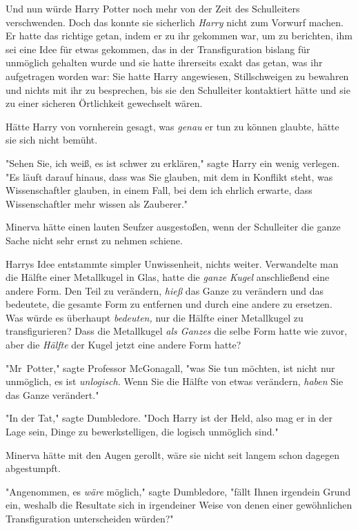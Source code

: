 {Und nun würde Harry Potter noch mehr von der Zeit des Schulleiters verschwenden. Doch das konnte sie sicherlich \emph{Harry} nicht zum Vorwurf machen. Er hatte das richtige getan, indem er zu ihr gekommen war, um zu berichten, ihm sei eine Idee für etwas gekommen, das in der Transfiguration bislang für unmöglich gehalten wurde und sie hatte ihrerseits exakt das getan, was ihr aufgetragen worden war: Sie hatte Harry angewiesen, Stillschweigen zu bewahren und nichts mit ihr zu besprechen, bis sie den Schulleiter kontaktiert hätte und sie zu einer sicheren Örtlichkeit gewechselt wären.

Hätte Harry von vornherein gesagt, was \emph{genau} er tun zu können glaubte, hätte sie sich nicht bemüht.

"Sehen Sie, ich weiß, es ist schwer zu erklären," sagte Harry ein wenig verlegen. "Es läuft darauf hinaus, dass was Sie glauben, mit dem in Konflikt steht, was Wissenschaftler glauben, in einem Fall, bei dem ich ehrlich erwarte, dass Wissenschaftler mehr wissen als Zauberer."

Minerva hätte einen lauten Seufzer ausgestoßen, wenn der Schulleiter die ganze Sache nicht sehr ernst zu nehmen schiene.

Harrys Idee entstammte simpler Unwissenheit, nichts weiter. Verwandelte man die Hälfte einer Metallkugel in Glas, hatte die \emph{ganze Kugel} anschließend eine andere Form. Den Teil zu verändern, \emph{hieß} das Ganze zu verändern und das bedeutete, die gesamte Form zu entfernen und durch eine andere zu ersetzen. Was würde es überhaupt \emph{bedeuten,} nur die Hälfte einer Metallkugel zu transfigurieren? Dass die Metallkugel \emph{als Ganzes} die selbe Form hatte wie zuvor, aber die \emph{Hälfte} der Kugel jetzt eine andere Form hatte?

"Mr~Potter," sagte Professor McGonagall, "was Sie tun möchten, ist nicht nur unmöglich, es ist \emph{unlogisch.} Wenn Sie die Hälfte von etwas verändern, \emph{haben} Sie das Ganze verändert."

"In der Tat," sagte Dumbledore. "Doch Harry ist der Held, also mag er in der Lage sein, Dinge zu bewerkstelligen, die logisch unmöglich sind."

Minerva hätte mit den Augen gerollt, wäre sie nicht seit langem schon dagegen abgestumpft.

"Angenommen, es \emph{wäre} möglich," sagte Dumbledore, "fällt Ihnen irgendein Grund ein, weshalb die Resultate sich in irgendeiner Weise von denen einer gewöhnlichen Transfiguration unterscheiden würden?"

}
